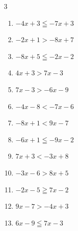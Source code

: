 \begin{multicols}{3}
\begin{enumerate}

  \item $-4x+3\leqq -7x+3$

        \phantom{$\displaystyle x\leqq 0$}

  \item $-2x+1>-8x+7$

        \phantom{$\displaystyle x>1$}

  \item $-8x+5\leqq -2x-2$


  \item $4x+3>7x-3$

        \phantom{$\displaystyle x<2$}

  \item $7x-3>-6x-9$


  \item $-4x-8<-7x-6$


  \item $-8x+1<9x-7$


  \item $-6x+1\leqq -9x-2$

        \phantom{$\displaystyle x\leqq -1$}

  \item $7x+3<-3x+8$


\columnbreak %

  \item $-3x-6>8x+5$

        \phantom{$\displaystyle x<-1$}

  \item $-2x-5\geqq 7x-2$


  \item $9x-7>-4x+3$


  \item $6x-9\leqq 7x-3$

        \phantom{$\displaystyle x\geqq -6$}


\end{enumerate}
\end{multicols}
